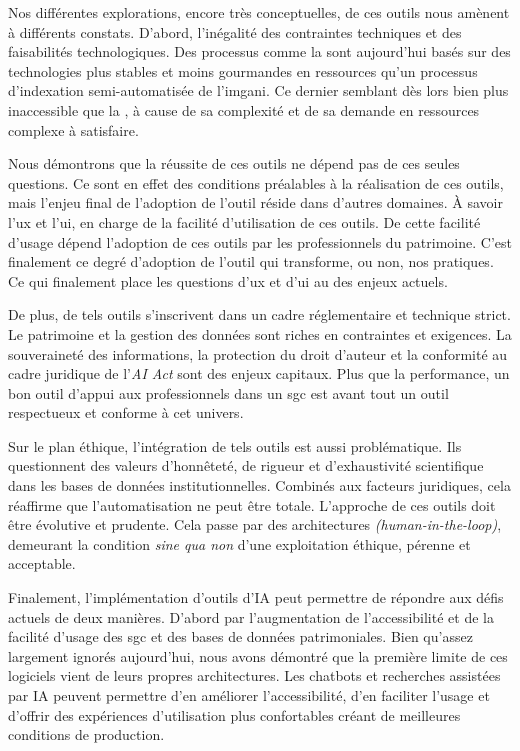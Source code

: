 Nos différentes explorations, encore très conceptuelles, de ces outils nous amènent à différents constats. D'abord, l'inégalité des contraintes techniques et des faisabilités technologiques. Des processus comme la  sont aujourd'hui basés sur des technologies plus stables et moins gourmandes en ressources qu'un processus d'indexation semi-automatisée de l'\gls{imgani}. Ce dernier semblant dès lors bien plus inaccessible que la , à cause de sa complexité et de sa demande en ressources complexe à satisfaire. 

Nous démontrons que la réussite de ces outils ne dépend pas de ces seules questions. Ce sont en effet des conditions préalables à la réalisation de ces outils, mais l'enjeu final de l'adoption de l'outil réside dans d'autres domaines. À savoir l'\gls{ux} et l'\gls{ui}, en charge de la facilité d'utilisation de ces outils. De cette facilité d'usage dépend l'adoption de ces outils par les professionnels du patrimoine. C'est finalement ce degré d'adoption de l'outil qui transforme, ou non, nos pratiques. Ce qui finalement place les questions d'\gls{ux} et d'\gls{ui} au \coeur des enjeux actuels. 

De plus, de tels outils s'inscrivent dans un cadre réglementaire et technique strict. Le patrimoine et la gestion des données sont riches en contraintes et exigences. La souveraineté des informations, la protection du droit d'auteur et la conformité au cadre juridique de l'\textit{AI Act} sont des enjeux capitaux. Plus que la performance, un bon outil d'appui aux professionnels dans un \gls{sgc} est avant tout un outil respectueux et conforme à cet univers.

Sur le plan éthique, l'intégration de tels outils est aussi problématique. Ils questionnent des valeurs d'honnêteté, de rigueur et d'exhaustivité scientifique dans les bases de données institutionnelles. Combinés aux facteurs juridiques, cela réaffirme que l'automatisation ne peut être totale. L'approche de ces outils doit être évolutive et prudente. Cela passe par des architectures \textit{(human-in-the-loop)}, demeurant la condition \textit{sine qua non} d'une exploitation éthique, pérenne et acceptable.\newline

Finalement, l'implémentation d'outils d'\gls{IA} peut permettre de répondre aux défis actuels de deux manières. D'abord par l'augmentation de l'accessibilité et de la facilité d'usage des \gls{sgc} et des bases de données patrimoniales. Bien qu'assez largement ignorés aujourd'hui, nous avons démontré que la première limite de ces logiciels vient de leurs propres architectures. Les \glspl{chatbot} et recherches assistées par \gls{IA} peuvent permettre d'en améliorer l'accessibilité, d'en faciliter l'usage et d'offrir des expériences d'utilisation plus confortables créant de meilleures conditions de production. 

